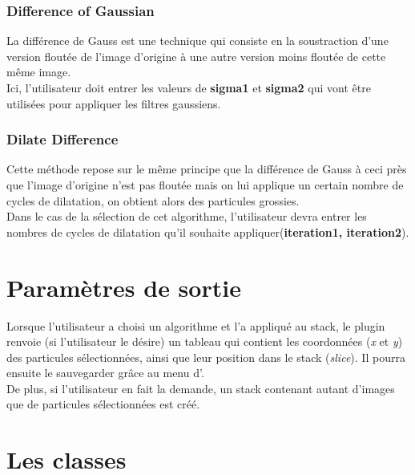 \documentclass[12pt,a4paper]{report}
\begin{document}
\subsubsection{Difference of Gaussian}

La différence de Gauss est une technique qui consiste en la soustraction d'une version floutée de l'image d'origine à une autre version moins floutée de cette même image.\\
Ici, l'utilisateur doit entrer les valeurs de \textbf{sigma1} et \textbf{sigma2} qui vont être utilisées pour appliquer les filtres gaussiens.

\subsubsection{Dilate Difference}

Cette méthode repose sur le même principe que la différence de Gauss à ceci près que l'image d'origine n'est pas floutée mais on lui applique un certain nombre de cycles de dilatation, on obtient alors des particules grossies.\\
Dans le cas de la sélection de cet algorithme, l'utilisateur devra entrer les nombres de cycles de dilatation qu'il souhaite appliquer(\textbf{iteration1, iteration2}).

\section{Paramètres de sortie}

Lorsque l'utilisateur a choisi un algorithme et l'a appliqué au stack, le plugin renvoie (si l'utilisateur le désire) un tableau qui contient les coordonnées (\emph{x} et \emph{y}) des particules sélectionnées, ainsi que leur position dans le stack (\emph{slice}). Il pourra ensuite le sauvegarder grâce au menu d'\imj.\\
De plus, si l'utilisateur en fait la demande, un stack contenant autant d'images que de particules sélectionnées est créé.

\section{Les classes}
\end{document}
